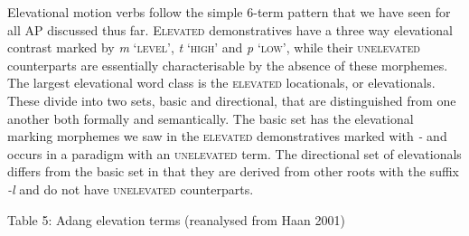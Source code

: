 Elevational motion verbs follow the simple 6-term pattern that we have seen for all AP discussed thus far. E\textsc{levated} demonstratives have a three way elevational contrast marked by \textit{m}\textit{{\textopeno}} {\textquoteleft}\textsc{level}{\textquoteright}, \textit{t}\textit{{\textopeno}} {\textquoteleft}\textsc{high}{\textquoteright} and \textit{p}\textit{{\textopeno}} {\textquoteleft}\textsc{low}{\textquoteright}, while their \textsc{unelevated} counterparts are essentially characterisable by the absence of these morphemes. The largest elevational word class is the \textsc{elevated} locationals, or elevationals. These divide into two sets, basic and directional, that are distinguished from one another both formally and semantically. The basic set has the elevational marking morphemes we saw in the \textsc{elevated} demonstratives marked with \textit{{}-}\textit{{\ng}} and occurs in a paradigm with an \textsc{unelevated }term. The directional set of elevationals differs from the basic set in that 
they are derived from other roots with the suffix \textit{{}-l}\textit{{\textepsilon}}\textit{ }and do not have \textsc{unelevated} counterparts.

{\centering
Table 5: Adang elevation terms (reanalysed from Haan 2001)
\par}

